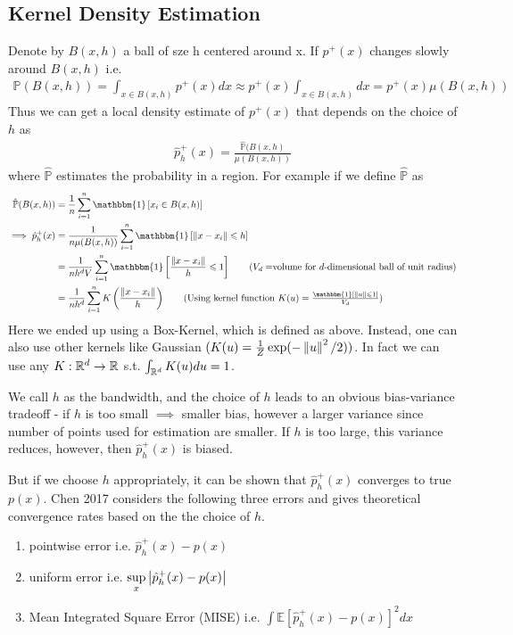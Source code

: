 \documentclass[11pt]{report}
\begin{document}
\subsection{Kernel Density Estimation}
Denote by $B(x, h)$ a ball of sze h centered around x. If $p^+(x)$ changes slowly around $B(x,h)$ i.e. 
\begin{align}
    \mathbb{P}(B(x,h)) = \int _{x \in B(x,h)} p^+(x)dx \approx p^+(x) \int _{x \in B(x,h)} dx = p^+(x) \mu(B(x,h))
\end{align}
Thus we can get a local density estimate of $p^+(x)$ that depends on the choice of $h$ as
\begin{align}
    \hat{p}_h^+(x) = \frac{\hat{\mathbb{P}}(B(x,h)}{\mu(B(x,h))}
\end{align}
where $\hat{\mathbb{P}}$ estimates the probability in a region. For example if we define $\hat{\mathbb{P}}$ as
\begin{align}
    \hat{\mathbb{P}}(B(x,h)) &= \frac{1}{n} \sum _{i=1} ^n \mathbbm{1}\left[ x_i \in B(x,h)\right]\\
    \implies \hat{p}_h^+(x) &= \frac{1}{n \mu(B(x,h))}\sum _{i=1} ^n \mathbbm{1}\left[ \norm{x - x_i} \leq h\right] \nonumber\\
    &= \frac{1}{nh^dV}\sum _{i=1} ^n \mathbbm{1}\left[ \frac{\norm{x - x_i}}{h} \leq 1\right] \tag*{\text{($V_d=$volume for $d$-dimensional ball of unit radius)}} \nonumber\\
    &= \frac{1}{nh^d}\sum _{i=1} ^n K\left(\frac{\norm{x - x_i}}{h}\right) \tag*{\text{(Using kernel function $K(u) = \frac{\mathbbm{1}[\norm{u} \leq 1]}{V_d}$)}} \nonumber\\
\end{align}
Here we ended up using a Box-Kernel, which is defined as above. Instead, one can also use other kernels like Gaussian $(K(u) = \frac{1}{Z} \exp(-\left\lVert u \right\rVert^2/2))$. In fact we can use any $K: \mathbb{R}^d \rightarrow \mathbb{R}$ s.t. $\int _{\mathbb{R}^d} K(u)du = 1$. 

We call $h$ as the bandwidth, and the choice of $h$ leads to an obvious bias-variance tradeoff - if $h$ is too small $\implies$ smaller bias, however a larger variance since number of points used for estimation are smaller. If $h$ is too large, this variance reduces, however, then $\hat{p}_h^+(x)$ is biased. 

But if we choose $h$ appropriately, it can be shown that $\hat{p}_h^+(x)$ converges to true $p(x)$. Chen 2017 \cite{Chen2017-ns} considers the following three errors and gives theoretical convergence rates based on the the choice of $h$. \begin{enumerate}
    \item pointwise error i.e. $\hat{p}_h^+(x) - p(x)$
    \item uniform error i.e. $\sup\limits_x \left\lvert{\hat{p}_h^+(x) - p(x)}\right\rvert$ 
    \item Mean Integrated Square Error (MISE) i.e. $\int \mathbb{E}\left[\hat{p}_h^+(x) - p(x)\right]^2dx$
\end{enumerate} 
\end{document}
